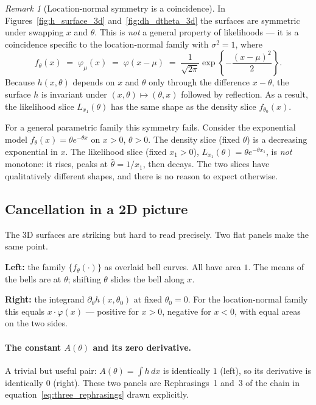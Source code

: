 \documentclass[a4paper,oneside,12pt]{extarticle}
\theoremstyle{plain}
\theoremstyle{definition}
\theoremstyle{remark}
\newtheorem{remark}[proposition]{Remark}
\begin{document}
\begin{remark}[Location-normal symmetry is a coincidence]
\label{rem:location_normal_symmetry}
In Figures~\ref{fig:h_surface_3d} and~\ref{fig:dh_dtheta_3d} the
surfaces are symmetric under swapping $x$ and $\theta$.  This is
\emph{not} a general property of likelihoods --- it is a coincidence
specific to the location-normal family with $\sigma^2 = 1$, where
\[
  f_\theta(x) \;=\; \varphi_\mu(x) \;=\; \varphi(x-\mu)
  \;=\; \frac{1}{\sqrt{2\pi}}\exp\!\left\{-\frac{(x-\mu)^2}{2}\right\}.
\]
Because $h(x,\theta)$ depends on $x$ and $\theta$ only through the
difference $x - \theta$, the surface $h$ is invariant under
$(x,\theta) \mapsto (\theta,x)$ followed by reflection.  As a result,
the likelihood slice $L_{x_1}(\theta)$ has the same shape as the
density slice $f_{\theta_0}(x)$.

For a general parametric family this symmetry fails.  Consider the
exponential model $f_\theta(x) = \theta e^{-\theta x}$ on $x > 0$,
$\theta > 0$.  The density slice (fixed $\theta$) is a decreasing
exponential in $x$.  The likelihood slice (fixed $x_1 > 0$),
$L_{x_1}(\theta) = \theta e^{-\theta x_1}$, is \emph{not} monotone:
it rises, peaks at $\hat\theta = 1/x_1$, then decays.  The two slices
have qualitatively different shapes, and there is no reason to expect
otherwise.
\end{remark}

\subsection{Cancellation in a 2D picture}
\label{sec:cancellation_2d}

The 3D surfaces are striking but hard to read precisely.  Two
flat panels make the same point.

\textbf{Left:} the family $\{f_\theta(\cdot)\}$ as overlaid bell
curves.  All have area $1$.  The means of the bells are at $\theta$;
shifting $\theta$ slides the bell along $x$.

\textbf{Right:} the integrand $\partial_\theta h(x,\theta_0)$
at fixed $\theta_0 = 0$.  For the location-normal family this equals
$x\cdot\varphi(x)$ --- positive for $x>0$, negative for $x<0$,
with equal areas on the two sides.

\paragraph{The constant $A(\theta)$ and its zero derivative.}
A trivial but useful pair: $A(\theta) = \int h\,dx$ is identically
$1$ (left), so its derivative is identically $0$ (right).  These two
panels are Rephrasings~1 and~3 of the chain in
equation~\eqref{eq:three_rephrasings} drawn explicitly.
\end{document}
